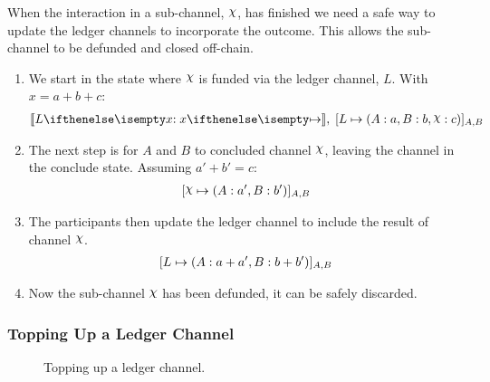 When the interaction in a sub-channel, $\rchi$, has finished we need a safe way to update the ledger channels to incorporate the outcome.
This allows the sub-channel to be defunded and closed off-chain.
\begin{enumerate}
  \item We start in the state where $\rchi$ is funded via the ledger channel, $L$. With $x = a + b + c$:
  \begin{align}
    \adj{\holds{L}{x}{}}, \; \finalizable{L}{\alloc{A: a, B: b, \rchi: c}}{A, B}
  \end{align}
  \item The next step is for $A$ and $B$ to concluded channel $\rchi$, leaving the channel in the conclude state. Assuming $a' + b' = c$:
  \begin{align}
    \finalizable{\rchi}{\alloc{A:a', B:b'}}{A,B}
  \end{align}
  \item The participants then update the ledger channel to include the result of channel $\rchi$.
  \begin{align}
    [L \mapsto ( A: a+ a', B: b + b' )]_{A, B}
  \end{align}
  \item Now the sub-channel $\rchi$ has been defunded, it can be safely discarded.
\end{enumerate}

\subsubsection{Topping Up a Ledger Channel}

\begin{figure}[h]\centering
  \makebox[\textwidth][c]{}
  \caption{
    Topping up a ledger channel.
  }\label{fig:ledger-top-up}
\end{figure}

